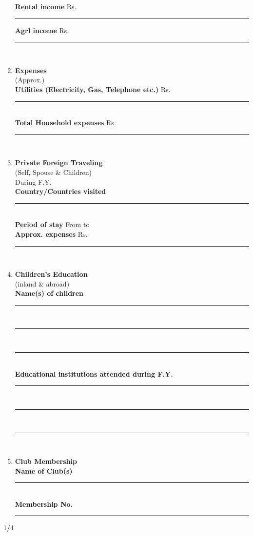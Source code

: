 \documentclass{article}
\begin{document}
\begin{enumerate}
    \textbf{Rental income} \hspace{1cm} Rs. \hspace{1cm} \rule{7cm}{0.5pt} \hspace{1cm} \textbf{Agrl income} \hspace{1cm} Rs. \hspace{1cm} \rule{7cm}{0.5pt} \\
    \item \textbf{Expenses} \\
    (Approx.) \\
    \textbf{Utilities (Electricity, Gas, Telephone etc.)} \hspace{1cm} Rs. \hspace{1cm} \rule{7cm}{0.5pt} \\
    \textbf{Total Household expenses} \hspace{1cm} Rs. \hspace{1cm} \rule{7cm}{0.5pt} \\
    \item \textbf{Private Foreign Traveling} \\
    (Self, Spouse \& Children) \\
    During F.Y. \underline{\hspace{5cm}} \\
    \textbf{Country/Countries visited} \hspace{1cm} \rule{10cm}{0.5pt} \\
    \textbf{Period of stay} \hspace{1cm} From \underline{\hspace{2cm}} to \underline{\hspace{2cm}} \\
    \textbf{Approx. expenses} \hspace{1cm} Rs. \hspace{1cm} \rule{7cm}{0.5pt} \\
    \item \textbf{Children's Education} \\
    (inland \& abroad) \\
    \textbf{Name(s) of children} \hspace{1cm} \rule{10cm}{0.5pt} \\
    \rule{10cm}{0.5pt} \\
    \rule{10cm}{0.5pt} \\
    \textbf{Educational institutions attended during F.Y.} \\
    \rule{10cm}{0.5pt} \\
    \rule{10cm}{0.5pt} \\
    \rule{10cm}{0.5pt} \\
    \item \textbf{Club Membership} \\
    \textbf{Name of Club(s)} \hspace{1cm} \rule{10cm}{0.5pt} \\
    \textbf{Membership No.} \hspace{1cm} \rule{10cm}{0.5pt}
\end{enumerate}
\begin{center}
1/4
\end{center}
\end{document}
